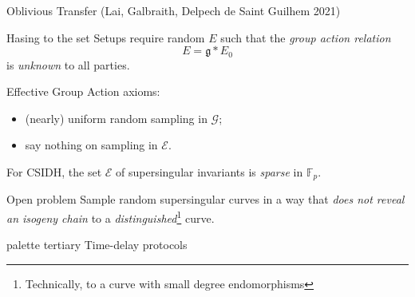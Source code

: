 \documentclass[aspectratio=169]{beamer}
\newcommand{\F}{\mathbb{F}}
\newcommand{\g}{{\mathfrak{g}}}
\newcommand{\G}{{\mathcal{G}}}
\newcommand{\E}{{\mathcal{E}}}
\begin{document}
\begin{frame}{Oblivious Transfer \small(Lai, Galbraith, Delpech de Saint Guilhem 2021)}
  \centering
\end{frame}


\begin{frame}{Hasing to the set}
  Setups require random $E$ such that the \emph{group action relation}
  \[E = \g * E_0\]
  is \emph{unknown} to all parties.

  \bigskip
  Effective Group Action axioms:
  \begin{itemize}
  \item (nearly) uniform random sampling in $\G$;
  \item say nothing on sampling in $\E$.
  \end{itemize}
  For CSIDH, the set $\E$ of supersingular invariants is \emph{sparse}
  in $\F_p$.

  \begin{block}{Open problem}
    Sample random supersingular curves in a way that \emph{does not
      reveal an isogeny chain} to a
    \textit{distinguished}\footnote{Technically, to a curve with small
      degree endomorphisms} curve.
  \end{block}
\end{frame}


\begin{frame}[plain]
  \begin{beamercolorbox}[sep=0.1px,center,wd=\paperwidth,sep=0.5\paperheight]{palette tertiary}
        \Huge\centering Time-delay protocols
  \end{beamercolorbox}
\end{frame}
\end{document}
